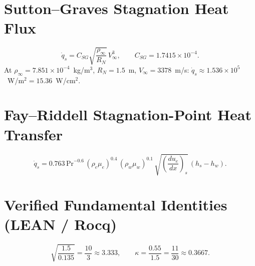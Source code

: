 \section{Sutton--Graves Stagnation Heat Flux}
\[
\dot q_s=C_{SG}\sqrt{\frac{\rho_\infty}{R_N}}\,V_\infty^3,\qquad
C_{SG}=1.7415\times10^{-4}.
\]
At $\rho_\infty=7.851\times10^{-4}$~kg/m$^3$, $R_N=1.5$~m,
$V_\infty=3378$~m/s: $\dot q_s\approx1.536\times10^5$~W/m$^2=15.36$~W/cm$^2$.

\section{Fay--Riddell Stagnation-Point Heat Transfer}
\[
\dot q_s=0.763\,\mathrm{Pr}^{-0.6}\,(\rho_e\mu_e)^{0.4}\,(\rho_w\mu_w)^{0.1}\,
\sqrt{\left(\frac{du_e}{dx}\right)_s}\,(h_s-h_w).
\]

\section{Verified Fundamental Identities (LEAN / Rocq)}
\[
\sqrt{\frac{1.5}{0.135}}=\frac{10}{3}\approx3.333,\qquad
\kappa=\frac{0.55}{1.5}=\frac{11}{30}\approx0.3667.
\]
